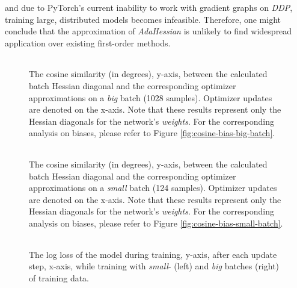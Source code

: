 and due to PyTorch's current inability to work with gradient graphs on \emph{DDP}, training large, distributed models becomes infeasible.
Therefore, one might conclude that the approximation of \emph{AdaHessian} is unlikely to find widespread application over existing first-order methods.
\begin{figure}[h!]
    \centering
    \begin{tabular}{cc}
         \\ %
    \end{tabular}
    \caption{The cosine similarity (in degrees), y-axis, between the calculated batch Hessian diagonal and the corresponding optimizer approximations on a \emph{big} batch (1028 samples).
    Optimizer updates are denoted on the x-axis.
    Note that these results represent only the Hessian diagonals for the network's \emph{weights}. For the corresponding analysis on biases, please refer to Figure \ref{fig:cosine-bias-big-batch}.}
    \label{fig:cosine-big-batch}
\end{figure}


\begin{figure}[h!]
    \centering
    \begin{tabular}{cc}
         \\ %
    \end{tabular}
    \caption{The cosine similarity (in degrees), y-axis, between the calculated batch Hessian diagonal and the corresponding optimizer approximations on a \emph{small} batch (124 samples).
    Optimizer updates are denoted on the x-axis.
    Note that these results represent only the Hessian diagonals for the network's \emph{weights}. For the corresponding analysis on biases, please refer to Figure \ref{fig:cosine-bias-small-batch}.
}
    \label{fig:cosine-small-batch}
\end{figure}

\begin{figure}[h!]
    \centering
    \begin{tabular}{cc}
         \\ %
    \end{tabular}
    \caption{The log loss of the model during training, y-axis, after each update step, x-axis, while training with  \emph{small}- (left) and \emph{big} batches (right) of training data.}
    \label{fig:loss-big-batch}
\end{figure}

